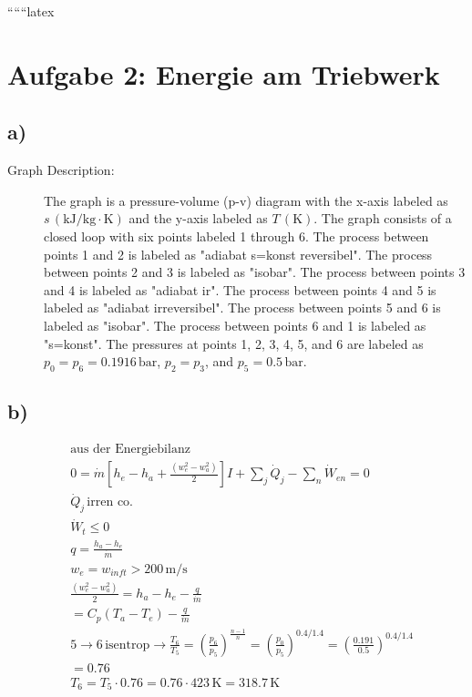
``````latex


\section*{Aufgabe 2: Energie am Triebwerk}

\subsection*{a)}

\begin{description}
    \item[Graph Description:] The graph is a pressure-volume (p-v) diagram with the x-axis labeled as $s \, (\text{kJ}/\text{kg} \cdot \text{K})$ and the y-axis labeled as $T \, (\text{K})$. The graph consists of a closed loop with six points labeled 1 through 6. The process between points 1 and 2 is labeled as "adiabat s=konst reversibel". The process between points 2 and 3 is labeled as "isobar". The process between points 3 and 4 is labeled as "adiabat ir". The process between points 4 and 5 is labeled as "adiabat irreversibel". The process between points 5 and 6 is labeled as "isobar". The process between points 6 and 1 is labeled as "s=konst". The pressures at points 1, 2, 3, 4, 5, and 6 are labeled as $p_0 = p_6 = 0.1916 \, \text{bar}$, $p_2 = p_3$, and $p_5 = 0.5 \, \text{bar}$.
\end{description}

\subsection*{b)}

\begin{align*}
    &\text{aus der Energiebilanz} \\
    &0 = \dot{m} \left[ h_e - h_a + \frac{(w_e^2 - w_a^2)}{2} \right] I + \sum_j \dot{Q}_j - \sum_n \dot{W}_{en} = 0 \\
    &\dot{Q}_j \, \text{irren co.} \\
    &\dot{W}_t \leq 0 \\
    &q = \frac{h_a - h_e}{\dot{m}} \\
    &w_e = w_{inft} > 200 \, \text{m/s} \\
    &\frac{(w_e^2 - w_a^2)}{2} = h_a - h_e - \frac{q}{\dot{m}} \\
    &= C_p (T_a - T_e) - \frac{q}{\dot{m}} \\
    &5 \rightarrow 6 \, \text{isentrop} \rightarrow \frac{T_6}{T_5} = \left( \frac{p_6}{p_5} \right)^{\frac{n-1}{n}} = \left( \frac{p_0}{p_5} \right)^{0.4/1.4} = \left( \frac{0.191}{0.5} \right)^{0.4/1.4} \\
    &= 0.76 \\
    &T_6 = T_5 \cdot 0.76 = 0.76 \cdot 423 \, \text{K} = 318.7 \, \text{K}
\end{align*}

